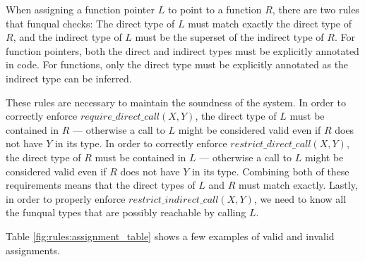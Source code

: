 When assigning a function pointer $L$ to point to a function $R$, there are two rules that funqual checks:  The direct type of $L$ must match exactly the direct type of $R$, and the indirect type of $L$ must be the superset of the indirect type of $R$.  For function pointers, both the direct and indirect types must be explicitly annotated in code.  For functions, only the direct type must be explicitly annotated as the indirect type can be inferred.  

These rules are necessary to maintain the soundness of the system.  In order to correctly enforce $require\_direct\_call(X, Y)$, the direct type of $L$ must be contained in $R$ --- otherwise a call to $L$ might be considered valid even if $R$ does not have $Y$ in its type.  In order to correctly enforce $restrict\_direct\_call(X, Y)$, the direct type of $R$ must be contained in $L$ --- otherwise a call to $L$ might be considered valid even if $R$ does not have $Y$ in its type.  Combining both of these requirements means that the direct types of $L$ and $R$ must match exactly.  Lastly, in order to properly enforce $restrict\_indirect\_call(X, Y)$, we need to know all the funqual types that are possibly reachable by calling $L$.  

Table \ref{fig:rules:assignment_table} shows a few examples of valid and invalid assignments.  

